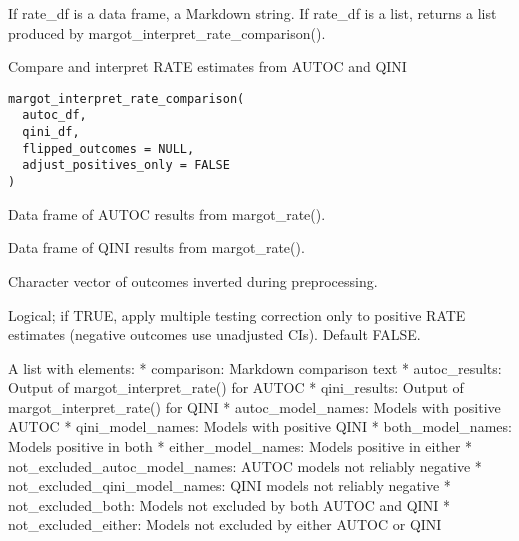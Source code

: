 \documentclass[a4paper]{book}
\begin{document}
%
\begin{Value}
If rate\_df is a data frame, a Markdown string. If rate\_df is a list,
returns a list produced by margot\_interpret\_rate\_comparison().
\end{Value}
%
\begin{Description}
Compare and interpret RATE estimates from AUTOC and QINI
\end{Description}
%
\begin{Usage}
\begin{verbatim}
margot_interpret_rate_comparison(
  autoc_df,
  qini_df,
  flipped_outcomes = NULL,
  adjust_positives_only = FALSE
)
\end{verbatim}
\end{Usage}
%
\begin{Arguments}
\begin{ldescription}
\item[\code{autoc\_df}] Data frame of AUTOC results from margot\_rate().

\item[\code{qini\_df}] Data frame of QINI results from margot\_rate().

\item[\code{flipped\_outcomes}] Character vector of outcomes inverted during preprocessing.

\item[\code{adjust\_positives\_only}] Logical; if TRUE, apply multiple testing correction only to positive RATE estimates (negative outcomes use unadjusted CIs). Default FALSE.
\end{ldescription}
\end{Arguments}
%
\begin{Value}
A list with elements:
* comparison: Markdown comparison text
* autoc\_results: Output of margot\_interpret\_rate() for AUTOC
* qini\_results: Output of margot\_interpret\_rate() for QINI
* autoc\_model\_names: Models with positive AUTOC
* qini\_model\_names: Models with positive QINI
* both\_model\_names: Models positive in both
* either\_model\_names: Models positive in either
* not\_excluded\_autoc\_model\_names: AUTOC models not reliably negative
* not\_excluded\_qini\_model\_names: QINI models not reliably negative
* not\_excluded\_both: Models not excluded by both AUTOC and QINI
* not\_excluded\_either: Models not excluded by either AUTOC or QINI
\end{Value}
\end{document}
